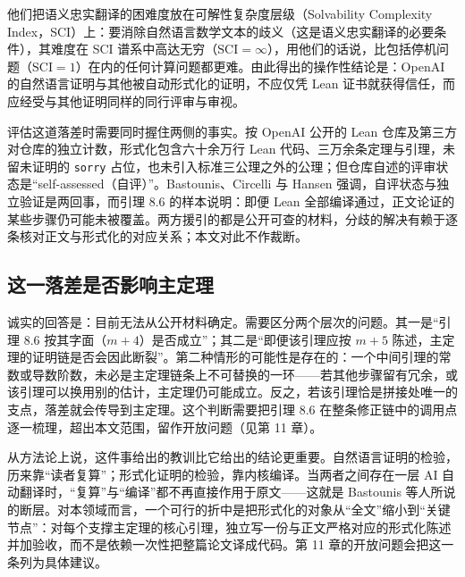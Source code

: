 他们把语义忠实翻译的困难度放在可解性复杂度层级（Solvability Complexity Index，SCI）上：要消除自然语言数学文本的歧义（这是语义忠实翻译的必要条件），其难度在 SCI 谱系中高达无穷（$\mathrm{SCI}=\infty$），用他们的话说，比包括停机问题（$\mathrm{SCI}=1$）在内的任何计算问题都更难。由此得出的操作性结论是：OpenAI 的自然语言证明与其他被自动形式化的证明，不应仅凭 Lean 证书就获得信任，而应经受与其他证明同样的同行评审与审视。

评估这道落差时需要同时握住两侧的事实。按 OpenAI 公开的 Lean 仓库及第三方对仓库的独立计数，形式化包含六十余万行 Lean 代码、三万余条定理与引理，未留未证明的 \texttt{sorry} 占位，也未引入标准三公理之外的公理；但仓库自述的评审状态是“self-assessed（自评）”。Bastounis、Circelli 与 Hansen 强调，自评状态与独立验证是两回事，而引理 8.6 的样本说明：即便 Lean 全部编译通过，正文论证的某些步骤仍可能未被覆盖\cite{bch}。两方援引的都是公开可查的材料，分歧的解决有赖于逐条核对正文与形式化的对应关系；本文对此不作裁断。

\subsection{这一落差是否影响主定理}

诚实的回答是：目前无法从公开材料确定。需要区分两个层次的问题。其一是“引理 8.6 按其字面（$m+4$）是否成立”；其二是“即便该引理应按 $m+5$ 陈述，主定理的证明链是否会因此断裂”。第二种情形的可能性是存在的：一个中间引理的常数或导数阶数，未必是主定理链条上不可替换的一环——若其他步骤留有冗余，或该引理可以换用别的估计，主定理仍可能成立。反之，若该引理恰是拼接处唯一的支点，落差就会传导到主定理。这个判断需要把引理 8.6 在整条修正链中的调用点逐一梳理，超出本文范围，留作开放问题（见第 11 章）。

从方法论上说，这件事给出的教训比它给出的结论更重要。自然语言证明的检验，历来靠“读者复算”；形式化证明的检验，靠内核编译。当两者之间存在一层 AI 自动翻译时，“复算”与“编译”都不再直接作用于原文——这就是 Bastounis 等人所说的断层。对本领域而言，一个可行的折中是把形式化的对象从“全文”缩小到“关键节点”：对每个支撑主定理的核心引理，独立写一份与正文严格对应的形式化陈述并加验收，而不是依赖一次性把整篇论文译成代码。第 11 章的开放问题会把这一条列为具体建议。
